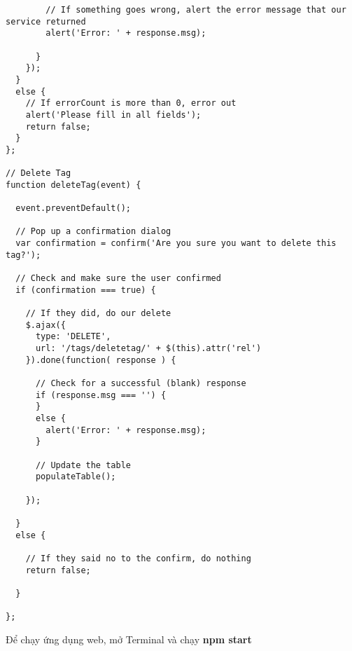 \begin{lstlisting}
        // If something goes wrong, alert the error message that our service returned
        alert('Error: ' + response.msg);

      }
    });
  }
  else {
    // If errorCount is more than 0, error out
    alert('Please fill in all fields');
    return false;
  }
};

// Delete Tag
function deleteTag(event) {

  event.preventDefault();

  // Pop up a confirmation dialog
  var confirmation = confirm('Are you sure you want to delete this tag?');

  // Check and make sure the user confirmed
  if (confirmation === true) {

    // If they did, do our delete
    $.ajax({
      type: 'DELETE',
      url: '/tags/deletetag/' + $(this).attr('rel')
    }).done(function( response ) {

      // Check for a successful (blank) response
      if (response.msg === '') {
      }
      else {
        alert('Error: ' + response.msg);
      }

      // Update the table
      populateTable();

    });

  }
  else {

    // If they said no to the confirm, do nothing
    return false;

  }

};

\end{lstlisting}


Để chạy ứng dụng web, mở Terminal và chạy \textbf{npm start}
\label{ref{fig4_10}}



